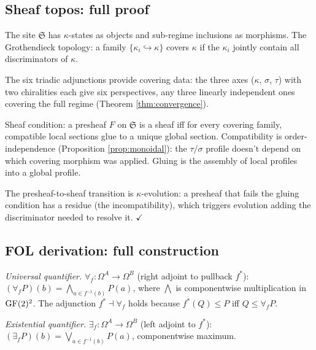 \subsection{Sheaf topos: full proof}
\label{app:sheaf-full}

The site $\mathfrak{S}$ has $\kappa$-states as objects and
sub-regime inclusions as morphisms. The Grothendieck
topology: a family $\{\kappa_i \hookrightarrow \kappa\}$
covers $\kappa$ if the $\kappa_i$ jointly contain all
discriminators of $\kappa$.

The six triadic adjunctions provide covering data: the
three axes ($\kappa$, $\sigma$, $\tau$) with two chiralities
each give six perspectives, any three linearly independent
ones covering the full regime (Theorem \ref{thm:convergence}).

Sheaf condition: a presheaf $F$ on $\mathfrak{S}$ is a
sheaf iff for every covering family, compatible local
sections glue to a unique global section. Compatibility
is order-independence (Proposition \ref{prop:monoidal}):
the $\tau/\sigma$ profile doesn't depend on which covering
morphism was applied. Gluing is the assembly of local
profiles into a global profile.

The presheaf-to-sheaf transition is $\kappa$-evolution:
a presheaf that fails the gluing condition has a residue
(the incompatibility), which triggers evolution adding the
discriminator needed to resolve it. $\checkmark$

\subsection{FOL derivation: full construction}
\label{app:fol}

\emph{Universal quantifier.}
$\forall_f: \Omega^A \to \Omega^B$ (right adjoint to
pullback $f^*$): $(\forall_f P)(b) = \bigwedge_{a \in
f^{-1}(b)} P(a)$, where $\bigwedge$ is componentwise
multiplication in $\operatorname{GF}(2)^2$. The adjunction
$f^* \dashv \forall_f$ holds because $f^*(Q) \leq P$ iff
$Q \leq \forall_f P$.

\emph{Existential quantifier.}
$\exists_f: \Omega^A \to \Omega^B$ (left adjoint to $f^*$):
$(\exists_f P)(b) = \bigvee_{a \in f^{-1}(b)} P(a)$,
componentwise maximum.

